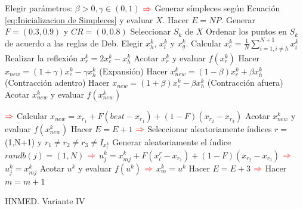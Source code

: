 \begin{algorithm}
	\begin{algorithmic}[1]
		\STATE Elegir parámetros: $\beta>0, \gamma \in (0,1)$
		\STATE $\color{red} \Rightarrow $ Generar símpleces según Ecuación \ref{eq:Inicializacion de Simpleces} y evaluar $X$.
		\STATE Hacer $E=NP$.
		\STATE Generar $F=(0.3,0.9)$ y $CR=(0,0.8)$
		\STATE Seleccionar $S_k$ de $X$
		\STATE Ordenar los puntos en $S_k$ de acuerdo a las reglas de Deb.
		\STATE Elegir $x^k_h$, $x^k_l$ y $x^k_g$.
		\STATE Calcular $x^k_c=\frac{1}{N} \sum_{i=1, i\neq h }^{N+1} x^k_i$
		\STATE Realizar la reflexión $x^k_r=2x^k_c -x^k_h$
		\STATE Acotar  $x^k_r$ y evaluar  $f(x^k_r)$
		\STATE Hacer $x_{new}=(1+\gamma)x^k_c-\gamma x^k_h$ (Expansión)
		\ELSE {}
		\STATE Hacer $x^k_{new}=(1-\beta)x^k_c+\beta x^k_h$ (Contracción adentro)
		\ENDIF
		\ELSE {}
		\STATE Hacer $x_{new}=(1+\beta)x^k_c-\beta x^k_h$ (Contracción afuera)
		\ENDIF
		\ENDIF
		\STATE Acotar $x^k_{new}$ y evaluar $f(x^k_{new})$
		
		
		\STATE $\color{red} \Rightarrow $  Calcular  $x_{new}= x_{r_1}+F(best-x_{r_1})+(1-F)(x_{r_2}-x_{r_3})$
		\STATE Acotar  $x^k_{new}$ y evaluar  $f(x^k_{new})$  
		\STATE Hacer  $E=E+1$ 
		\ENDIF
		\STATE $\color{red} \Rightarrow $ Seleccionar aleatoriamente índices $r=$(1,N+1) y $r_1 \neq r_2 \neq r_3 \neq I_{x^k_l} $
		\STATE Generar aleatoriamente el índice $randb(j)=(1,N)$ 
		\STATE $\color{red} \Rightarrow $ $u^k_{j} =  x^k_{mj}+F(x^r_l-x_{r_1})+(1-F)(x_{r_2}-x_{r_3})$
		\ELSE 
		\STATE $\color{red} \Rightarrow $ $u^k_{j} = x^k_{mj}$
		\ENDIF
		\ENDFOR
		\STATE Acotar $u^k$ y evaluar $f(u^k)$
		\STATE $\color{red} \Rightarrow $ $x^k_m = u^k$
		\ENDIF
		\STATE Hacer  $E=E+3$
		\ENDFOR
		\STATE $\color{red} \Rightarrow $ Hacer  $m=m+1$
		\ENDWHILE
	\end{algorithmic}
	\caption{HNMED. Variante IV}\label{alg:HNMEDV6}
\end{algorithm}

